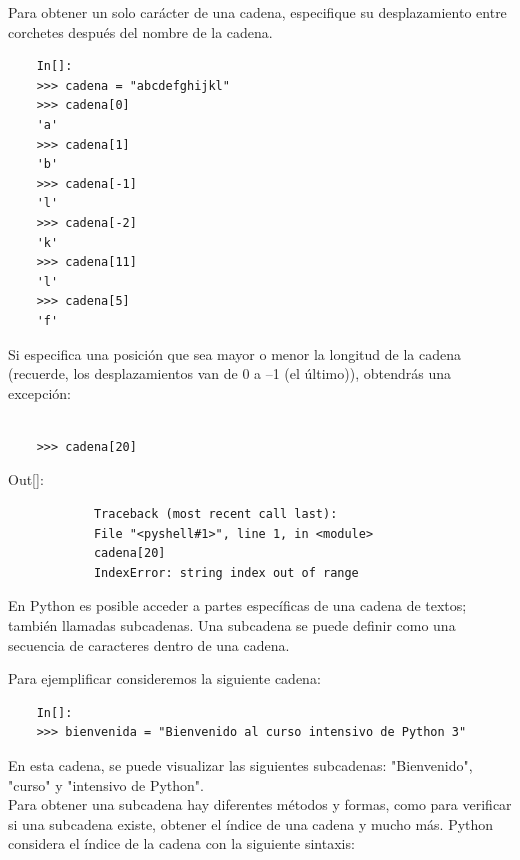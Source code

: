 Para obtener un solo carácter de una cadena, especifique su desplazamiento entre corchetes después del
nombre de la cadena. 

\begin{lstlisting}
	In[]:
	>>> cadena = "abcdefghijkl"
	>>> cadena[0]
	'a'
	>>> cadena[1]
	'b'
	>>> cadena[-1]
	'l'
	>>> cadena[-2]
	'k'
	>>> cadena[11]
	'l'
	>>> cadena[5]
	'f'
\end{lstlisting}

Si especifica una posición que sea mayor o menor la longitud de la cadena (recuerde, los desplazamientos van
de 0 a  –1 (el último)), obtendrás una excepción:

\begin{lstlisting}
	
	>>> cadena[20]
\end{lstlisting}

{\ttfamily\scriptsize\scriptsize 
	\hspace{-0.65cm}Out[]:\vspace{-0.15cm}	
	{\color{red} 	
		\begin{verbatim}		
			Traceback (most recent call last):
			File "<pyshell#1>", line 1, in <module>
			cadena[20]
			IndexError: string index out of range
		\end{verbatim}
}} 

En Python es posible acceder a partes específicas de una cadena de textos; también llamadas subcadenas.
Una subcadena se puede definir como una secuencia de caracteres dentro de una cadena. 

Para ejemplificar consideremos la siguiente cadena:


\begin{lstlisting}
	In[]:
	>>> bienvenida = "Bienvenido al curso intensivo de Python 3"
\end{lstlisting}

En esta cadena, se puede visualizar las siguientes subcadenas: {\ttfamily  "Bienvenido", "{}curso{}" {} y {} "{}intensivo de Python"{}}.\\



Para obtener una subcadena hay  diferentes métodos y formas, como para verificar si una subcadena existe,  obtener el índice de una cadena y mucho más. Python considera el índice de la cadena con la siguiente sintaxis: 

